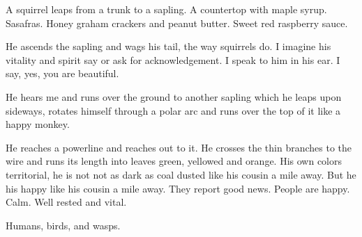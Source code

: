 

A squirrel leaps from a trunk to a sapling.  A countertop with maple
syrup.  Sasafras.  Honey graham crackers and peanut butter.  Sweet red
raspberry sauce.  

He ascends the sapling and wags his tail, the way squirrels do.  I
imagine his vitality and spirit say or ask for acknowledgement.  I
speak to him in his ear.  I say, yes, you are beautiful.  

He hears me and runs over the ground to another sapling which he leaps
upon sideways, rotates himself through a polar arc and runs over the
top of it like a happy monkey.  

He reaches a powerline and reaches out to it.  He crosses the thin
branches to the wire and runs its length into leaves green, yellowed
and orange.  His own colors territorial, he is not not as dark as coal
dusted like his cousin a mile away.  But he his happy like his cousin
a mile away.  They report good news.  People are happy.  Calm.  Well
rested and vital.  

Humans, birds, and wasps.

\bye
